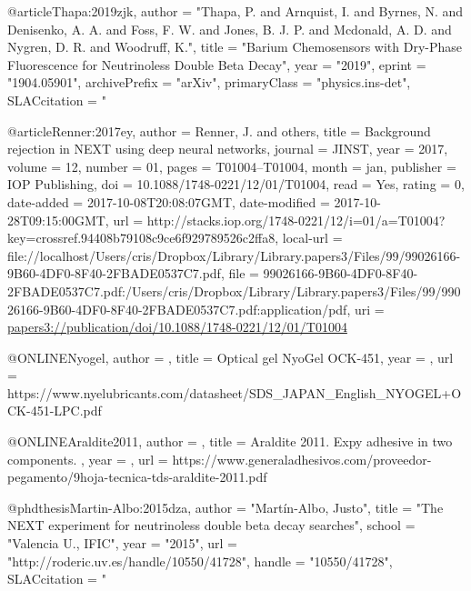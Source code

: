 {{{{{{{{{{{@article{Thapa:2019zjk,
      author         = "Thapa, P. and Arnquist, I. and Byrnes, N. and Denisenko,
                        A. A. and Foss, F. W. and Jones, B. J. P. and Mcdonald, A.
                        D. and Nygren, D. R. and Woodruff, K.",
      title          = "{Barium Chemosensors with Dry-Phase Fluorescence for
                        Neutrinoless Double Beta Decay}",
      year           = "2019",
      eprint         = "1904.05901",
      archivePrefix  = "arXiv",
      primaryClass   = "physics.ins-det",
      SLACcitation   = "%
}


@article{Renner:2017ey,
author = {Renner, J. and others},
title = {{Background rejection in NEXT using deep neural networks}},
journal = {JINST},
year = {2017},
volume = {12},
number = {01},
pages = {T01004--T01004},
month = jan,
publisher = {IOP Publishing},
doi = {10.1088/1748-0221/12/01/T01004},
read = {Yes},
rating = {0},
date-added = {2017-10-08T20:08:07GMT},
date-modified = {2017-10-28T09:15:00GMT},
url = {http://stacks.iop.org/1748-0221/12/i=01/a=T01004?key=crossref.94408b79108c9ce6f929789526c2ffa8},
local-url = {file://localhost/Users/cris/Dropbox/Library/Library.papers3/Files/99/99026166-9B60-4DF0-8F40-2FBADE0537C7.pdf},
file = {{99026166-9B60-4DF0-8F40-2FBADE0537C7.pdf:/Users/cris/Dropbox/Library/Library.papers3/Files/99/99026166-9B60-4DF0-8F40-2FBADE0537C7.pdf:application/pdf}},
uri = {\url{papers3://publication/doi/10.1088/1748-0221/12/01/T01004}}
}







@ONLINE{Nyogel,
author = {},
title = {Optical gel NyoGel OCK-451},
year = {},
url = {https://www.nyelubricants.com/datasheet/SDS_JAPAN_English_NYOGEL+OCK-451-LPC.pdf}
}

@ONLINE{Araldite2011,
author = {},
title = {Araldite 2011. Expy adhesive in two components. },
year = {},
url = {https://www.generaladhesivos.com/proveedor-pegamento/9hoja-tecnica-tds-araldite-2011.pdf}
}

@phdthesis{Martin-Albo:2015dza,
      author         = "Mart\'in-Albo, Justo",
      title          = "{The NEXT experiment for neutrinoless double beta decay
                        searches}",
      school         = "Valencia U., IFIC",
      year           = "2015",
      url            = "http://roderic.uv.es/handle/10550/41728",
      handle         = "10550/41728",
      SLACcitation   = "%
}

}}}}}}}}}}}
